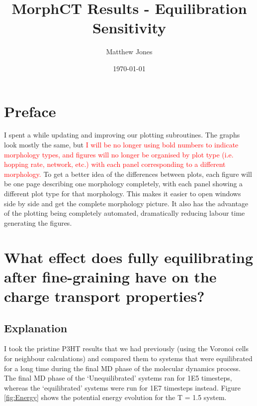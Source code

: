 \documentclass[12pt]{article}
\title{MorphCT Results - Equilibration Sensitivity}
\author{Matthew Jones}
\date{\today}
\begin{document}
\maketitle

\section{Preface}

I spent a while updating and improving our plotting subroutines.
The graphs look mostly the same, but \textcolor{red}{I will be no longer using bold numbers to indicate morphology types, and figures will no longer be organised by plot type (i.e. hopping rate, network, etc.) with each panel corresponding to a different morphology.}
To get a better idea of the differences between plots, each figure will be one page describing one morphology completely, with each panel showing a different plot type for that morphology.
This makes it easier to open windows side by side and get the complete morphology picture.
It also has the advantage of the plotting being completely automated, dramatically reducing labour time generating the figures.


\section{What effect does fully equilibrating after fine-graining have on the charge transport properties?}


\subsection{Explanation}


I took the pristine P3HT results that we had previously (using the Voronoi cells for neighbour calculations) and compared them to systems that were equilibrated for a long time during the final MD phase of the molecular dynamics process.
The final MD phase of the `Unequilibrated' systems ran for 1E5 timesteps, whereas the `equilibrated' systems were run for 1E7 timesteps instead.
Figure \ref{fig:Energy} shows the potential energy evolution for the T = 1.5 system.
\end{document}
